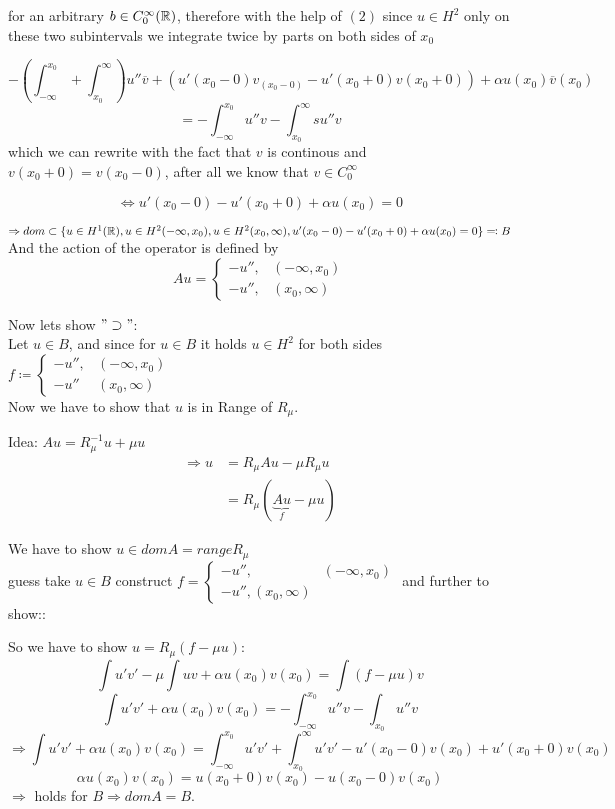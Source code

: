 for an arbitrary $b \in C_{0}^{\infty}(\mathbb{R})$, therefore with the help of $(2)$ since $u \in H^{2}$ only on these two subintervals we integrate twice by parts on both sides of $x_{0}$

\[ -\left( \int_{-\infty}^{x_{0}} + \int_{x_{0}}^{\infty}\right) u'' \overline{v} + \left( u'(x_{0}-0) v_(x_{0} - 0) - u'(x_{0} + 0)v(x_{0}+0) \right) + \alpha u(x_{0})\overline{v}(x_{0}) \]
\[  = - \int_{-\infty}^{x_{0}} u'' v - \int_{x_{0}}^{\infty}s u'' v \]
which we can rewrite with the fact that $v$ is continous and $v(x_{0}+0) = v(x_{0}-0)$, after all we know that $v \in C_{0}^{\infty}$

	\[ \Leftrightarrow u'(x_{0}-0) - u'(x_{0}+0) + \alpha u(x_{0}) = 0 \]
	
$\Rightarrow dom \subset \{ u \in H^{1}(\mathbb{R}), u \in H^{2}(-\infty, x_{0}), u \in H^{2}(x_{0}, \infty), u'(x_{0} - 0) - u'(x_{0} + 0) + \alpha u(x_{0}) = 0 \} \eqqcolon B$
And the action of the operator is defined by
\[A u = \begin{cases}
	-u'', & (-\infty, x_{0}) \\ -u'', & (x_{0}, \infty) \end{cases} \]
\newline	
	
Now lets show $"\supset"$: \\
Let $u \in B$, and since for $u \in B$ it holds $u \in H^{2}$ for both sides $f \coloneqq \begin{cases} -u'', & (-\infty, x_{0}) \\  -u'' &(x_{0}, \infty) \end{cases}$ \\
Now we have to show that $u$ is in Range of $R_{\mu}$.

Idea: $A u = R_{\mu}^{-1} u + \mu u$	
\begin{align*}
	\Rightarrow u & = R_{\mu} A u - \mu R_{\mu} u \\
				& = R_{\mu} (\underbrace{A u}_{f} - \mu u) 
\end{align*} 

We have to show $u \in dom A = range R_{\mu}$ \\
guess take $u \in B$ construct $f = \begin{cases}-u'', & (-\infty, x_{0}) \\ -u'', (x_{0},\infty)\end{cases}$ and further to show::

So we have to show $u = R_{\mu}(f - \mu u)$:
\[ \int u' v' - \mu \int u v + \alpha u(x_{0}) v(x_{0}) = \int(f-\mu u)v \]
\[ \int u' v' + \alpha u(x_{0}) v(x_{0}) = - \int_{-\infty}^{x_{0}} u'' v - \int_{x_{0}}u'' v \]  
\[ \Rightarrow \int u' v' + \alpha u(x_{0}) v(x_{0}) = \int_{-\infty}^{x_{0}} u'v' + \int_{x_{0}}^{\infty} u'v' -u'(x_{0}-0) v(x_{0})  + u'(x_{0}+0) v(x_{0}) \]
\[ \alpha u(x_{0})v(x_{0}) = u(x_{0}+0)v(x_{0}) - u(x_{0}-0)v(x_{0}) \]
$\Rightarrow$ holds for $B \Rightarrow dom A = B$.

